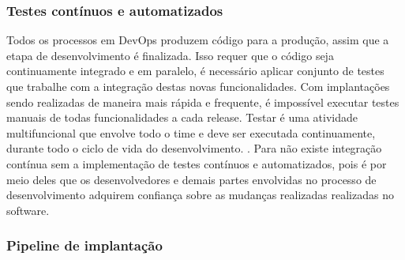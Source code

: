 \documentclass[twoside,english,brazilian]{UNISINOSartigo}
\begin{document}
\subsubsection{Testes contínuos e automatizados}
Todos os processos em DevOps produzem código para a produção, assim que a etapa de desenvolvimento é finalizada. Isso requer que o código seja continuamente integrado e em paralelo, é necessário aplicar conjunto de testes que trabalhe com a integração destas novas funcionalidades. Com implantações sendo realizadas de maneira mais rápida e frequente, é impossível executar testes manuais  de todas funcionalidades a cada release. Testar é uma atividade multifuncional que envolve todo o time e deve ser executada continuamente, durante todo o ciclo de vida do desenvolvimento. \cite{Humble2012}.  
Para  não existe integração contínua sem a implementação de testes contínuos e automatizados, pois é por meio deles que os desenvolvedores e demais partes envolvidas no processo de desenvolvimento adquirem confiança sobre as mudanças realizadas realizadas no software.

\subsubsection{Pipeline de implantação}
\end{document}
